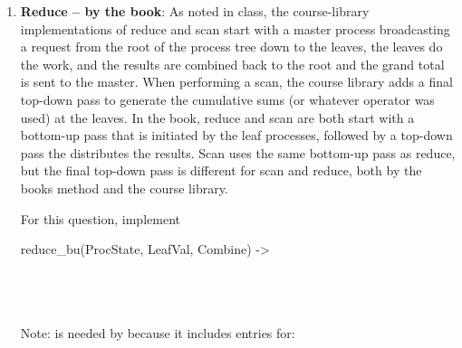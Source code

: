 \documentclass{article}
\begin{document}
\begin{enumerate}
  \item \textbf{Reduce -- by the book}:  As noted in class, the course-library implementations of reduce and scan
    start with a master process broadcasting a request from the root of the process tree down to the leaves, the
    leaves do the work, and the results are combined back to the root and the grand total is sent to the master.
    When performing a scan, the course library adds a final top-down pass to generate the cumulative sums (or
    whatever operator was used) at the leaves.  In the book, reduce and scan are both start with a bottom-up
    pass that is initiated by the leaf processes, followed by a top-down pass the distributes the results.  Scan
    uses the same bottom-up pass as reduce, but the final top-down pass is different for scan and reduce, both by
    the books method and the course library.
    \par
    For this question, implement
    \begin{SmallCode}
      reduce\_bu(ProcState, LeafVal, Combine) -> \\
      \>\\
      \>\\
      \>\\
    \end{SmallCode}
    Note:  is needed by  because it includes entries for:
\end{enumerate}
\end{document}
